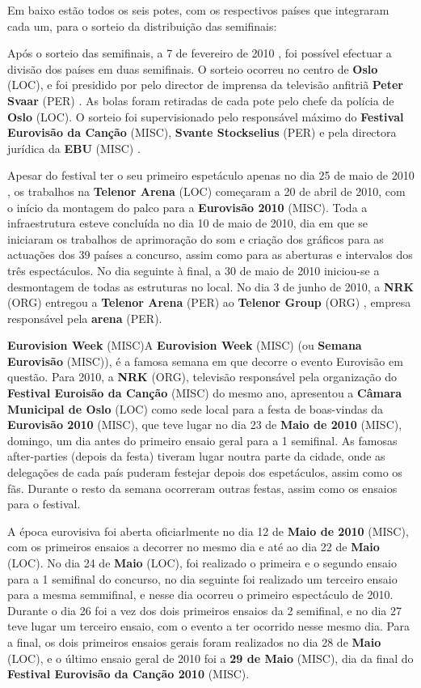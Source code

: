 \documentclass[12pt,a4paper]{article}
\begin{document}
Em baixo estão todos os seis potes, com os respectivos países que integraram cada um, para o sorteio da distribuição das semifinais:

Após o sorteio das semifinais, a 7 de fevereiro de 2010 , foi possível efectuar a divisão dos países em duas semifinais. O sorteio ocorreu no centro de \textbf{Oslo} (LOC), e foi presidido por pelo director de imprensa da televisão anfitriã \textbf{Peter Svaar} (PER) . As bolas foram retiradas de cada pote pelo chefe da polícia de \textbf{Oslo} (LOC). O sorteio foi supervisionado pelo responsável máximo do \textbf{Festival Eurovisão da Canção} (MISC), \textbf{Svante Stockselius} (PER) e pela directora jurídica da \textbf{EBU} (MISC) .

Apesar do festival ter o seu primeiro espetáculo apenas no dia 25 de maio de 2010 , os trabalhos na \textbf{Telenor Arena} (LOC) começaram a 20 de abril de 2010, com o início da montagem do palco para a \textbf{Eurovisão 2010} (MISC). Toda a infraestrutura esteve concluída no dia 10 de maio de 2010, dia em que se iniciaram os trabalhos de aprimoração do som e criação dos gráficos para as actuações dos 39 países a concurso, assim como para as aberturas e intervalos dos três espectáculos. No dia seguinte à final, a 30 de maio de 2010 iniciou-se a desmontagem de todas as estruturas no local. No dia 3 de junho de 2010, a \textbf{NRK} (ORG) entregou a \textbf{Telenor Arena} (PER) ao \textbf{Telenor Group} (ORG) , empresa responsável pela \textbf{arena} (PER).



\textbf{Eurovision Week} (MISC)A \textbf{Eurovision Week} (MISC) (ou \textbf{Semana Eurovisão} (MISC)), é a famosa semana em que decorre o evento Eurovisão em questão. Para 2010, a \textbf{NRK} (ORG), televisão responsável pela organização do \textbf{Festival Euroisão da Canção} (MISC) do mesmo ano, apresentou a \textbf{Câmara Municipal de Oslo} (LOC) como sede local para a festa de boas-vindas da \textbf{Eurovisão 2010} (MISC), que teve lugar no dia 23 de \textbf{Maio de 2010} (MISC), domingo, um dia antes do primeiro ensaio geral para a 1 semifinal. As famosas after-parties (depois da festa) tiveram lugar noutra parte da cidade, onde as delegações de cada país puderam festejar depois dos espetáculos, assim como os fãs. Durante o resto da semana ocorreram outras festas, assim como os ensaios para o festival.

A época eurovisiva foi aberta oficiarlmente no dia 12 de \textbf{Maio de 2010} (MISC), com os primeiros ensaios a decorrer no mesmo dia e até ao dia 22 de \textbf{Maio} (LOC). No dia 24 de \textbf{Maio} (LOC), foi realizado o primeira e o segundo ensaio para a 1 semifinal do concurso, no dia seguinte foi realizado um terceiro ensaio para a mesma semmifinal, e nesse dia ocorreu o primeiro espectáculo de 2010. Durante o dia 26 foi a vez dos dois primeiros ensaios da 2 semifinal, e no dia 27 teve lugar um terceiro ensaio, com o evento a ter ocorrido nesse mesmo dia. Para a final, os dois primeiros ensaios gerais foram realizados no dia 28 de \textbf{Maio} (LOC), e o último ensaio geral de 2010 foi a \textbf{29 de Maio} (MISC), dia da final do \textbf{Festival Eurovisão da Canção 2010} (MISC).
\end{document}
